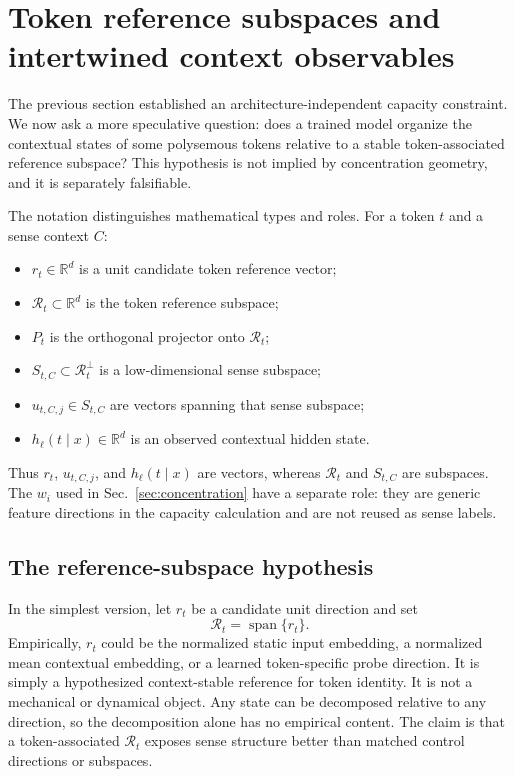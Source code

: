 \documentclass[
  aps,
  reprint,
  superscriptaddress,
  floatfix,
  nofootinbib,
  longbibliography
]{revtex4-2}
\newcommand{\R}{\mathbb{R}}
\DeclareMathOperator{\spanop}{span}
\begin{document}
\section{Token reference subspaces and intertwined context observables}
\label{sec:reference}

The previous section established an architecture-independent capacity
constraint. We now ask a more speculative question: does a trained model
organize the contextual states of some polysemous tokens relative to a
stable token-associated reference subspace? This hypothesis is not implied
by concentration geometry, and it is separately falsifiable.

The notation distinguishes mathematical types and roles. For a token $t$
and a sense context $C$:
%
\begin{itemize}
\item $r_t\in\R^d$ is a unit candidate token reference vector;
\item $\mathcal R_t\subset\R^d$ is the token reference subspace;
\item $P_t$ is the orthogonal projector onto $\mathcal R_t$;
\item $S_{t,C}\subset\mathcal R_t^\perp$ is a low-dimensional sense
subspace;
\item $u_{t,C,j}\in S_{t,C}$ are vectors spanning that sense subspace;
\item $h_\ell(t\mid x)\in\R^d$ is an observed contextual hidden state.
\end{itemize}
%
Thus $r_t$, $u_{t,C,j}$, and $h_\ell(t\mid x)$ are vectors, whereas
$\mathcal R_t$ and $S_{t,C}$ are subspaces. The $w_i$ used in
Sec.~\ref{sec:concentration} have a separate role: they are generic feature
directions in the capacity calculation and are not reused as sense labels.

\subsection{The reference-subspace hypothesis}
\label{sec:reference-hypothesis}

In the simplest version, let $r_t$ be a candidate unit direction and set
%
\begin{equation}
\label{eq:reference-direction}
\mathcal R_t=\spanop\{r_t\}.
\end{equation}
%
Empirically, $r_t$ could be the normalized static input embedding, a
normalized mean contextual embedding, or a learned token-specific probe
direction. It is simply a hypothesized context-stable reference for token
identity. It is not a mechanical or dynamical object.
Any state can be decomposed relative to any direction, so the decomposition
alone has no empirical content. The claim is that a token-associated
$\mathcal R_t$ exposes sense structure better than matched control
directions or subspaces.
\end{document}
